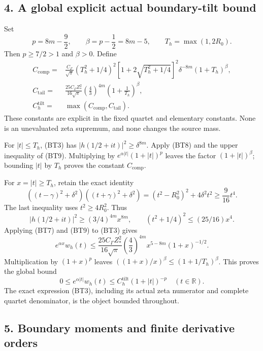 \subsection{4. A global explicit actual boundary-tilt bound}\label{bt:a-global-explicit-actual-boundary-tilt-bound}

Set \[
p=8m-\frac92,\qquad \beta=p-\frac12=8m-5,\qquad
T_h=\max(1,2R_0).
\tag{BT11}
\] Then \(p\ge7/2>1\) and \(\beta>0\). Define \[
\begin{split}
C_{\mathrm{comp}}
={}&\frac{C_\Gamma}{\sqrt\pi}
 (T_h^2+1/4)^2
 [1+2\sqrt{T_h^2+1/4}]^2
 \delta^{-8m}(1+T_h)^\beta,\\
C_{\mathrm{tail}}
={}&\frac{25C_\Gamma Z_*^2}{16\sqrt\pi}
 \left(\frac43\right)^{4m}
 \left(1+\frac1{T_h}\right)^\beta,\\
C_h^{\mathrm{tilt}}
={}&\max(C_{\mathrm{comp}},C_{\mathrm{tail}}).
\end{split}
\tag{BT12}
\] These constants are explicit in the fixed quartet and elementary constants. None is an unevaluated zeta supremum, and none changes the source mass.

For \(|t|\le T_h\), (BT3) has \(|h(1/2+it)|^2\ge\delta^{8m}\). Apply (BT8) and the upper inequality of (BT9). Multiplying by \(e^{\alpha|t|}(1+|t|)^p\) leaves the factor \((1+|t|)^\beta\); bounding \(|t|\) by \(T_h\) proves the constant \(C_{\mathrm{comp}}\).

For \(x=|t|\ge T_h\), retain the exact identity \[
((t-\gamma)^2+\delta^2)((t+\gamma)^2+\delta^2)
=(t^2-R_0^2)^2+4\delta^2t^2
\ge\frac9{16}t^4.
\tag{BT13}
\] The last inequality uses \(t^2\ge4R_0^2\). Thus \[
|h(1/2+it)|^2\ge(3/4)^{4m}x^{8m},
\qquad
(t^2+1/4)^2\le(25/16)x^4.
\] Applying (BT7) and (BT9) to (BT3) gives \[
e^{\alpha x}w_h(t)
\le\frac{25C_\Gamma Z_*^2}{16\sqrt\pi}
\left(\frac43\right)^{4m}
x^{5-8m}(1+x)^{-1/2}.
\] Multiplication by \((1+x)^p\) leaves \(((1+x)/x)^\beta\le(1+1/T_h)^\beta\). This proves the global bound \[
\boxed{
0\le e^{\alpha|t|}w_h(t)
\le C_h^{\mathrm{tilt}}(1+|t|)^{-p}
\quad(t\in\mathbb R).}
\tag{BT14}
\] The exact expression (BT3), including its actual zeta numerator and complete quartet denominator, is the object bounded throughout.

\subsection{5. Boundary moments and finite derivative orders}\label{bt:boundary-moments-and-finite-derivative-orders}

